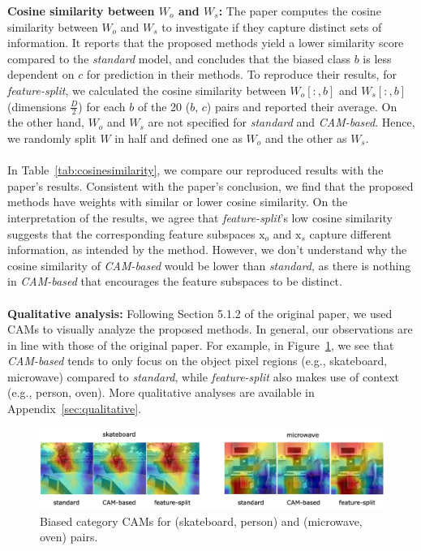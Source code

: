 \textbf{Cosine similarity between $W_o$ and $W_s$:} The paper computes the cosine similarity between $W_o$ and $W_s$ to investigate if they capture distinct sets of information. It reports that the proposed methods yield a lower similarity score compared to the \emph{standard} model, and concludes that the biased class $b$ is less dependent on $c$ for prediction in their methods. To reproduce their results, for \emph{feature-split}, we calculated the cosine similarity between $W_o[:,b]$ and $W_s[:,b]$ (dimensions $\frac{D}{2}$) for each $b$ of the 20 ($b$, $c$) pairs and reported their average. On the other hand, $W_o$ and $W_s$ are not specified for \emph{standard} and \emph{CAM-based}. Hence, we randomly split $W$ in half and defined one as $W_o$ and the other as $W_s$.\\
\\
In Table~\ref{tab:cosinesimilarity}, we compare our reproduced results with the paper's results. Consistent with the paper's conclusion, we find that the proposed methods have weights with similar or lower cosine similarity. On the interpretation of the results, we agree that \emph{feature-split}'s low cosine similarity suggests that the corresponding feature subspaces $\mathrm{x}_o$ and $\mathrm{x}_s$ capture different information, as intended by the method. However, we don't understand why the cosine similarity of \emph{CAM-based} would be lower than \emph{standard}, as there is nothing in \emph{CAM-based} that encourages the feature subspaces to be distinct.\\
\\
\textbf{Qualitative analysis:} Following Section 5.1.2 of the original paper, we used CAMs to visually analyze the proposed methods. In general, our observations are in line with those of the original paper. For example, in Figure~\ref{fig:cams}, we see that \emph{CAM-based} tends to only focus on the object pixel regions (e.g., skateboard, microwave) compared to \emph{standard}, while \emph{feature-split} also makes use of context (e.g., person, oven). More qualitative analyses are available in Appendix~\ref{sec:qualitative}.

\begin{figure}[h!]
    \centering
    \includegraphics[width=0.99\linewidth]{../openreview/images/cams_skateboard_microwave.png}
    \caption{Biased category CAMs for (skateboard, person) and (microwave, oven) pairs.}
    \label{fig:cams}
\end{figure}


